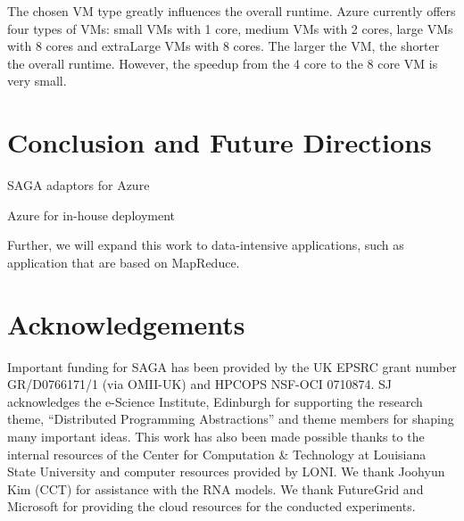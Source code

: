 \documentclass[conference,final]{IEEEtran}
\newcommand{\up}{\vspace*{-1em}}
\def\acknowledgementname{Acknowledgements}
\newenvironment{acknowledgement}%
{\section*{\acknowledgementname}%
\parindent=0pt%
}
\newcommand{\alnote}[1]{ {\textcolor{blue} { ***AL: #1 }}}
\newcommand{\alnote}[1]{}
\begin{document}
The chosen VM type greatly influences the overall runtime. Azure currently offers four
types of VMs: small VMs with 1 core, medium VMs with 2 cores, large VMs with 8 cores
and extraLarge VMs with 8 cores. The larger the VM, the shorter the overall runtime.
However, the speedup from the 4 core to the 8 core VM is very small.

\alnote{todo: compare to repex paper}



\alnote{qualitative comparison: easy coordination with queue service}
\alnote{distribution how easy in comparison to TG?}
\alnote{startup time based on different data center?}
\section{Conclusion and Future Directions}


SAGA adaptors for Azure

Azure for in-house deployment

Further, we will expand this work to data-intensive applications, such as 
application that are based on MapReduce.


\begin{acknowledgement} 
  \up \footnotesize{Important funding for SAGA has been provided by
    the UK EPSRC grant number GR/D0766171/1 (via OMII-UK) and HPCOPS
    NSF-OCI 0710874. SJ acknowledges the e-Science Institute,
    Edinburgh for supporting the research theme, ``Distributed
    Programming Abstractions'' and theme members for shaping many
    important ideas. This work has also been made possible thanks to
    the internal resources of the Center for Computation \& Technology
    at Louisiana State University and computer resources provided by
    LONI. We thank Joohyun Kim (CCT) for
    assistance with the RNA models. We thank FutureGrid and Microsoft
    for providing the cloud resources for the conducted experiments. }
\end{acknowledgement}

\up


\end{document}
